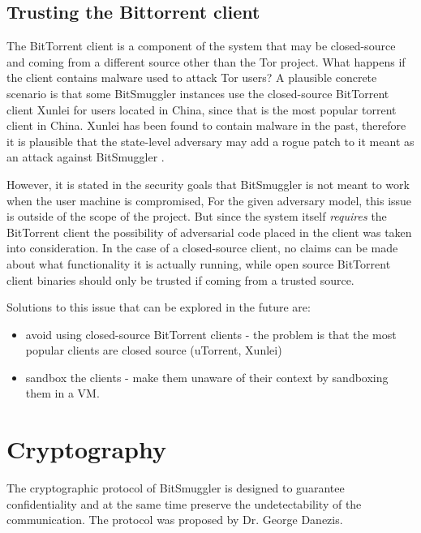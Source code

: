 \documentclass[11pt]{book} %
\newcommand{\projectName}{BitSmuggler }
\begin{document}

\subsection{Trusting the Bittorrent client}
\label{subsubsec:trustingBitTorrentClient}


The BitTorrent client is a component of the system that may be closed-source and coming from a different source other than the Tor project. What happens if the client contains malware used to attack Tor users? A plausible concrete scenario is that some \projectName instances use the closed-source BitTorrent client Xunlei for users located in China, since that is the most popular torrent client in China. Xunlei has been found to contain malware in the past, therefore it is plausible that the state-level adversary may add a rogue patch to it meant as an attack against \projectName.

However, it is stated in the security goals that \projectName is not meant to work when the user machine is compromised, For the given adversary model, this issue is outside of the scope of the project. But since the system itself \textit{requires} the BitTorrent client  the possibility of adversarial code placed in the client was taken into consideration. In the case of a closed-source client, no claims can be made about what functionality it is actually running, while open source BitTorrent client binaries should only be trusted if coming from a trusted source.

Solutions to this issue that can be explored in the future are:
\begin{itemize}
\item avoid using closed-source BitTorrent clients - the problem is that the most popular clients are closed source (uTorrent, Xunlei)
\item sandbox the clients - make them unaware of their context by sandboxing them in a VM.
\end{itemize}

\section{Cryptography}
\label{subsec:crypto}
\label{subsec:cryptoProtocol}
The cryptographic protocol of \projectName is designed to guarantee confidentiality and at the same time preserve the undetectability of the communication. The protocol was proposed by Dr. George Danezis.
\end{document}
